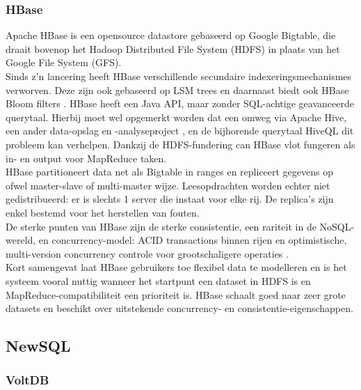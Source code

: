 \subsubsection{HBase}

Apache HBase is een opensource datastore gebaseerd op Google Bigtable, die draait bovenop het Hadoop Distributed File System (HDFS) in plaats van het Google File System (GFS).\\
Sinds z'n lancering heeft HBase verschillende secundaire indexeringsmechanismes verworven. Deze zijn ook gebaseerd op LSM trees en daarnaast biedt ook HBase Bloom filters \cite{borthakur2011apache}\cite{hbase_schema}. HBase heeft een Java API, maar zonder SQL-achtige geavanceerde querytaal. Hierbij moet wel opgemerkt worden dat een omweg via Apache Hive, een ander data-opslag en -analyseproject \cite{apache_hive}, en de bijhorende querytaal HiveQL dit probleem kan verhelpen. Dankzij de HDFS-fundering can HBase vlot fungeren als in- en output voor MapReduce taken.\\
HBase partitioneert data net als Bigtable in ranges en repliceert gegevens op ofwel master-slave of multi-master wijze. Leesopdrachten worden echter niet gedistribueerd: er is slechts 1 server die instaat voor elke rij. De replica's zijn enkel bestemd voor het herstellen van fouten.\\
De sterke punten van HBase zijn de sterke consistentie, een rariteit in de NoSQL-wereld, en concurrency-model: ACID transactions binnen rijen en optimistische, multi-version concurrency controle voor grootschaligere operaties \cite{hbase_acid}\cite{grolinger2013data}\cite{borthakur2011apache}.\\

Kort samengevat laat HBase gebruikers toe flexibel data te modelleren en is het systeem vooral nuttig wanneer het startpunt een dataset in HDFS is en MapReduce-compatibiliteit een prioriteit is. HBase schaalt goed naar zeer grote datasets en beschikt over uitstekende concurrency- en consistentie-eigenschappen.

\subsection{NewSQL} 

\subsubsection{VoltDB}

